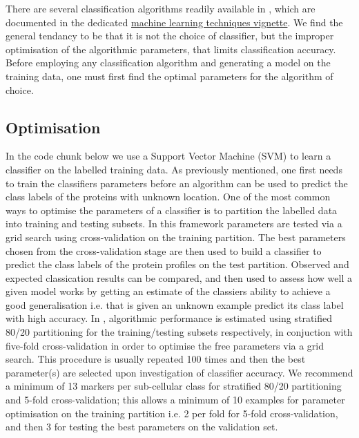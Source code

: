 There are several classification algorithms readily available in
, which are documented in the dedicated
\href{http://bioconductor.org/packages/release/bioc/vignettes/pRoloc/inst/doc/pRoloc-ml.pdf}{
  machine learning techniques vignette}.  We find the general tendancy
to be that it is not the choice of classifier, but the improper
optimisation of the algorithmic parameters, that limits classification
accuracy. Before employing any classification algorithm and generating
a model on the training data, one must first find the optimal
parameters for the algorithm of choice.

\subsection*{Optimisation}

In the code chunk below we use a Support Vector Machine (SVM) to learn
a classifier on the labelled training data. As previously mentioned,
one first needs to train the classifiers parameters before an
algorithm can be used to predict the class labels of the proteins with
unknown location. One of the most common ways to optimise the
parameters of a classifier is to partition the labelled data into
training and testing subsets. In this framework parameters are tested
via a grid search using cross-validation on the training
partition. The best parameters chosen from the cross-validation stage
are then used to build a classifier to predict the class labels of the
protein profiles on the test partition. Observed and expected
classication results can be compared, and then used to assess how well
a given model works by getting an estimate of the classiers ability to
achieve a good generalisation i.e. that is given an unknown example
predict its class label with high accuracy. In ,
algorithmic performance is estimated using stratified 80/20
partitioning for the training/testing subsets respectively, in
conjuction with five-fold cross-validation in order to optimise the
free parameters via a grid search. This procedure is usually repeated
100 times and then the best parameter(s) are selected upon
investigation of classifier accuracy. We recommend a minimum of 13
markers per sub-cellular class for stratified 80/20 partitioning and
5-fold cross-validation; this allows a minimum of 10 examples for
parameter optimisation on the training partition i.e. 2 per fold for
5-fold cross-validation, and then 3 for testing the best parameters on
the validation set.


